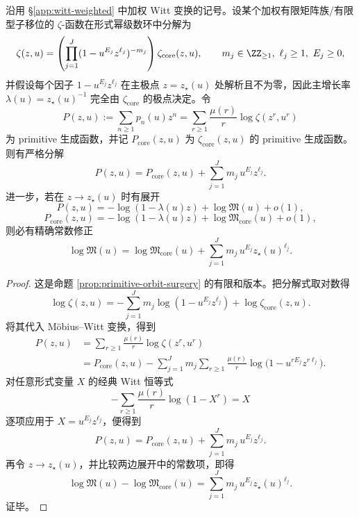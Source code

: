 \begin{theorem}\label{thm:xi-finite-euler-primitive-surgery-strict-additivity}
沿用 \S\ref{app:witt-weighted} 中加权 Witt 变换的记号。设某个加权有限矩阵族/有限型子移位的 \(\zeta\)-函数在形式幂级数环中分解为
\[
\zeta(z,u)=
\left(
\prod_{j=1}^{J}(1-u^{E_j}z^{\ell_j})^{-m_j}
\right)
\zeta_{\mathrm{core}}(z,u),
\qquad
m_j\in \ZZ_{\ge 1},\ \ell_j\ge 1,\ E_j\ge 0,
\]
并假设每个因子 \(1-u^{E_j}z^{\ell_j}\) 在主极点 \(z=z_\star(u)\) 处解析且不为零，因此主增长率 \(\lambda(u)=z_\star(u)^{-1}\) 完全由 \(\zeta_{\mathrm{core}}\) 的极点决定。令
\[
P(z,u):=\sum_{n\ge 1}p_n(u)z^n
=
\sum_{r\ge 1}\frac{\mu(r)}{r}\log \zeta(z^r,u^r)
\]
为 primitive 生成函数，并记 \(P_{\mathrm{core}}(z,u)\) 为 \(\zeta_{\mathrm{core}}(z,u)\) 的 primitive 生成函数。则有严格分解
\[
\boxed{\;
P(z,u)
=
P_{\mathrm{core}}(z,u)
+\sum_{j=1}^{J}m_j\,u^{E_j}z^{\ell_j}.\;}
\]
进一步，若在 \(z\to z_\star(u)\) 时有展开
\[
P(z,u)=-\log(1-\lambda(u)z)+\log\mathfrak M(u)+o(1),
\]
\[
P_{\mathrm{core}}(z,u)
=
-\log(1-\lambda(u)z)+\log\mathfrak M_{\mathrm{core}}(u)+o(1),
\]
则必有精确常数修正
\[
\boxed{\;
\log\mathfrak M(u)
=
\log\mathfrak M_{\mathrm{core}}(u)
+\sum_{j=1}^{J}m_j\,u^{E_j}z_\star(u)^{\ell_j}.\;}
\]
\end{theorem}
\begin{proof}
这是命题 \ref{prop:primitive-orbit-surgery} 的有限和版本。把分解式取对数得
\[
\log\zeta(z,u)
=
-\sum_{j=1}^{J}m_j\log(1-u^{E_j}z^{\ell_j})
+\log\zeta_{\mathrm{core}}(z,u).
\]
将其代入 Möbius--Witt 变换，得到
\[
\begin{aligned}
P(z,u)
&=
\sum_{r\ge 1}\frac{\mu(r)}{r}\log\zeta(z^r,u^r)\\
&=
P_{\mathrm{core}}(z,u)
-\sum_{j=1}^{J}m_j\sum_{r\ge 1}\frac{\mu(r)}{r}
\log\bigl(1-u^{rE_j}z^{r\ell_j}\bigr).
\end{aligned}
\]
对任意形式变量 \(X\) 的经典 Witt 恒等式
\[
-\sum_{r\ge 1}\frac{\mu(r)}{r}\log(1-X^r)=X
\]
逐项应用于 \(X=u^{E_j}z^{\ell_j}\)，便得到
\[
P(z,u)=P_{\mathrm{core}}(z,u)+\sum_{j=1}^{J}m_j\,u^{E_j}z^{\ell_j}.
\]
再令 \(z\to z_\star(u)\)，并比较两边展开中的常数项，即得
\[
\log\mathfrak M(u)-\log\mathfrak M_{\mathrm{core}}(u)
=
\sum_{j=1}^{J}m_j\,u^{E_j}z_\star(u)^{\ell_j}.
\]
证毕。
\end{proof}



